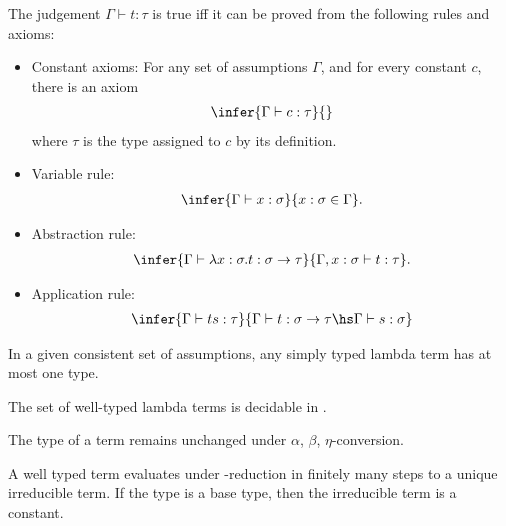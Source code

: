 \documentclass{article}
\begin{document}
\begin{definition*}
	The judgement $\Gamma\vdash t:\tau$ is true iff it can be proved from the following rules and
	axioms:
	\begin{itemize}
		\item Constant axioms: For any set of assumptions $\Gamma$, and for every constant $c$, there is an axiom \begin{align*}
			      \infer{\Gamma \vdash c:\tau}{}
		      \end{align*}
		      where $\tau$ is the type assigned to $c$ by its definition.
		\item Variable rule: \begin{align*}
			      \infer{\Gamma\vdash x:\sigma}{x:\sigma \in\Gamma}.
		      \end{align*}
		\item Abstraction rule: \begin{align*}
			      \infer{\Gamma\vdash \lambda x:\sigma.t:\sigma\to\tau}{\Gamma,x:\sigma\vdash t:\tau}.
		      \end{align*}
		\item Application rule: \begin{align*}
			      \infer{\Gamma \vdash ts : \tau }{\Gamma \vdash t : \sigma\to\tau \hs \Gamma\vdash s:\sigma}
		      \end{align*}
	\end{itemize}
\end{definition*}

\begin{theorem*}
	In a given consistent set of assumptions, any simply typed lambda term has at most one type.
\end{theorem*}

\begin{theorem*}[III.11]
	The set of well-typed lambda terms is decidable in \ptime.
\end{theorem*}

\begin{theorem*}
	The type of a term remains unchanged under $\alpha$, $\beta$, $\eta$-conversion.
\end{theorem*}

\begin{theorem*}
	A well typed term evaluates under \beta-reduction in finitely many steps to a unique irreducible
	term. If the type is a base type, then the irreducible term is a constant.
\end{theorem*}
\end{document}

